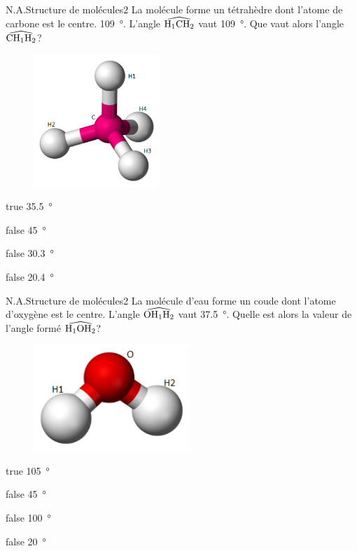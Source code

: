 		\begin{question}{N.A.}{Structure de molécules}{2}{}
			La molécule  forme un tétrahèdre dont l'atome de carbone est le centre. \SI{109}{\degree}. L'angle $\widehat{\ce{H}_1\ce{C}\ce{H}_2}$ vaut \SI{109}{\degree}. Que vaut alors l'angle $\widehat{\ce{C}\ce{H}_1\ce{H}_2}$?
			\begin{figure}
				\centering
				\includegraphics[height = 5cm]{Antoine/Figures_Antoine/300px-Tetrahedral-3D-balls.png}
			\end{figure}
		\end{question}
		\begin{reponses}
			\item[true] \SI{35.5}{\degree}
			\item[false] \SI{45}{\degree}
			\item[false] \SI{30.3}{\degree}
			\item[false] \SI{20.4}{\degree}
		\end{reponses}
		\begin{question}{N.A.}{Structure de molécules}{2}{}
			La molécule d'eau forme un coude dont l'atome d'oxygène est le centre. L'angle $\widehat{\ce{O}\ce{H}_1\ce{H}_2}$ vaut \SI{37.5}{\degree}. Quelle est alors la valeur de l'angle formé $\widehat{\ce{H}_1\ce{O}\ce{H}_2}$?
			\begin{figure}
				\centering
				\includegraphics[height = 4cm]{Antoine/Figures_Antoine/240px-Water-3D-balls.png}
			\end{figure}
		\end{question}
			\begin{reponses}
			\item[true] \SI{105}{\degree}
			\item[false] \SI{45}{\degree}
			\item[false] \SI{100}{\degree}
			\item[false] \SI{20}{\degree}
			\end{reponses}
